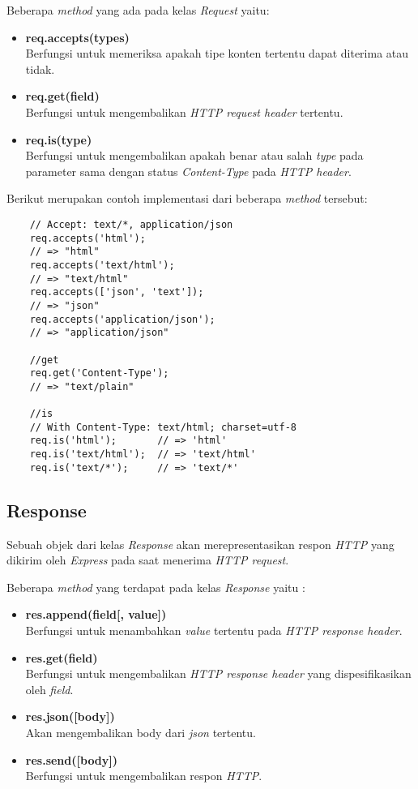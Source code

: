 Beberapa \textit{method} yang ada pada kelas \textit{Request} yaitu: 
\begin{itemize}
	\item \textbf{req.accepts(types)} \\ Berfungsi untuk memeriksa apakah tipe konten tertentu dapat diterima atau tidak.
	
	\item \textbf{req.get(field)} \\ Berfungsi untuk mengembalikan \textit{HTTP request header} tertentu.
	
	\item \textbf{req.is(type)} \\ Berfungsi untuk mengembalikan apakah benar atau salah \textit{type} pada parameter sama dengan status \textit{Content-Type} pada \textit{HTTP header}.
\end{itemize}

Berikut merupakan contoh implementasi dari beberapa \textit{method} tersebut:

\begin{lstlisting}
	// Accept: text/*, application/json
	req.accepts('html');
	// => "html"
	req.accepts('text/html');
	// => "text/html"
	req.accepts(['json', 'text']);
	// => "json"
	req.accepts('application/json');
	// => "application/json"
	
	//get
	req.get('Content-Type');
	// => "text/plain"
	
	//is
	// With Content-Type: text/html; charset=utf-8
	req.is('html');       // => 'html'
	req.is('text/html');  // => 'text/html'
	req.is('text/*');     // => 'text/*'
\end{lstlisting}

\subsection{Response}
Sebuah objek dari kelas \textit{Response} akan merepresentasikan respon \textit{HTTP} yang dikirim oleh \textit{Express} pada saat menerima \textit{HTTP request}.

Beberapa \textit{method} yang terdapat pada kelas \textit{Response} yaitu : 

\begin{itemize}
	\item \textbf{res.append(field[, value])} \\ Berfungsi untuk menambahkan \textit{value} tertentu pada \textit{HTTP response header}.
	
	\item \textbf{res.get(field)} \\ Berfungsi untuk mengembalikan \textit{HTTP response header} yang dispesifikasikan oleh \textit{field}.
	
	\item \textbf{res.json([body])} \\ Akan mengembalikan body dari \textit{json} tertentu.
	
	\item \textbf{res.send([body])} \\ Berfungsi untuk mengembalikan respon \textit{HTTP}.
\end{itemize}


